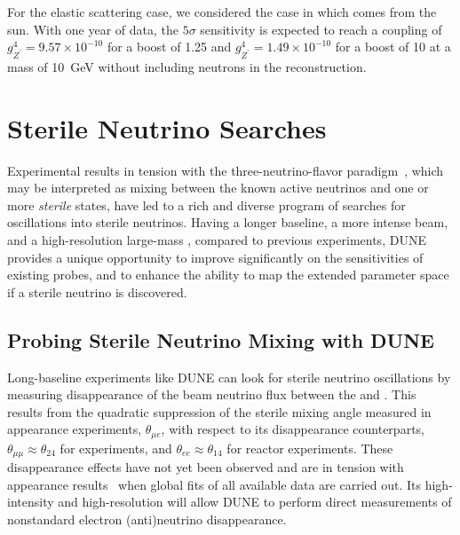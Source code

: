 For the elastic scattering case, we considered the case in which  comes from the sun. 
With one year of data, the $5\sigma$ sensitivity is expected to reach a coupling of $g_{Z^\prime}^4 = 9.57 \times 10^{-10}$ for a boost of 1.25 and $g_{Z^\prime}^4 = 1.49 \times 10^{-10}$ for a boost of 10 at a  mass of \SI{10}{GeV} without including neutrons in the reconstruction.



\section{Sterile Neutrino Searches}
Experimental results in tension with the three-neutrino-flavor paradigm~\cite{LSNDSterile,MiniBooNESterile,GalliumSummary,ReactorSummary}, which may be interpreted as mixing between the known active neutrinos and one or more \textit{sterile} states, have led to a rich and diverse program of searches for oscillations into sterile neutrinos. Having a longer baseline, a more intense beam, and a high-resolution large-mass , %
compared to previous experiments, DUNE provides a unique opportunity to improve significantly on the sensitivities of existing probes, and to enhance the ability to map the extended parameter space if a sterile neutrino is discovered.
	
\subsection{Probing Sterile Neutrino Mixing with DUNE}

    Long-baseline experiments like DUNE can look for sterile neutrino oscillations by measuring disappearance of the beam neutrino flux between the  and . This results from the quadratic suppression of the sterile mixing angle measured in appearance experiments, $\theta_{\mu e}$, with respect to its disappearance counterparts, $\theta_{\mu\mu}\approx\theta_{24}$ for  experiments, and $\theta_{ee}\approx\theta_{14}$ for reactor experiments. These disappearance effects have not yet been observed and are in tension with appearance results~\cite{ref:tension} when global fits of all available data are carried out. %
    Its high-intensity and high-resolution  will allow DUNE %
    to perform direct measurements of nonstandard electron (anti)neutrino disappearance. 

